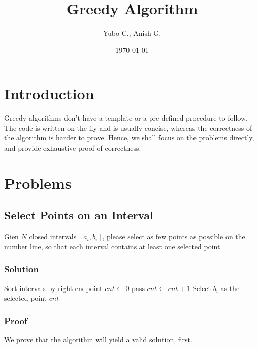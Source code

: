 \documentclass{article}
\title{Greedy Algorithm}
\date{\today}
\author{Yubo C., Anish G.}
\begin{document}
\maketitle

\section{Introduction}

Greedy algorithms don't have a template or a pre-defined procedure to follow.
The code is written on the fly and is usually concise, whereas the correctness of the algorithm is harder to prove.
Hence, we shall focus on the problems directly, and provide exhaustive proof of correctness.

\section{Problems}

\subsection{Select Points on an Interval}

Gien $N$ closed intervals $[a_i,b_i]$, please select as few points as possible on the number line, so that each interval contains at least one selected point.

\subsubsection{Solution}

\begin{algorithm}[H]
    \BlankLine
    Sort intervals by right endpoint\;
    $cnt \gets 0$\;
    {
        {
            pass\;
        }
        \Else
        {
            $cnt \gets cnt + 1$\;
            Select $b_i$ as the selected point\;
        }
    }
    \Return $cnt$\;
\end{algorithm}

\subsubsection{Proof}

We prove that the algorithm will yield a valid solution, first.
\end{document}
